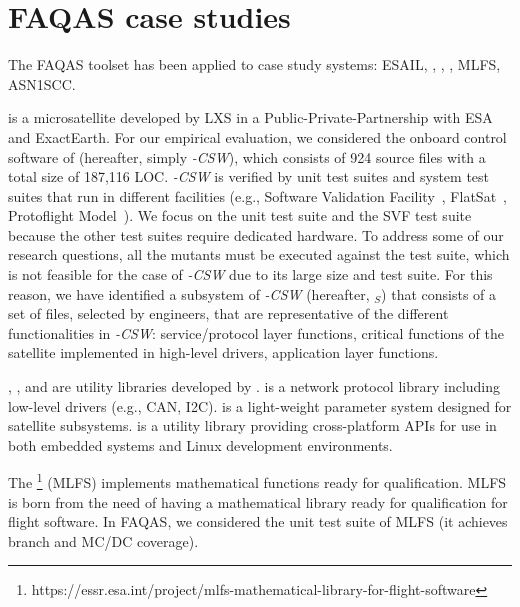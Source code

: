 
\chapter{FAQAS case studies}
\label{chapter:caseStudies}

\STARTCHANGEDFINAL
The FAQAS toolset has been applied to  case study systems:
ESAIL, \GCSP{}, \PARAM{}, \UTIL{}, MLFS, ASN1SCC.

 
 is a microsatellite developed by LXS in a Public-Private-Partnership with ESA and ExactEarth. For our empirical evaluation, we considered the onboard control software of \SAIL{} (hereafter, simply \SAIL{}\emph{-CSW}), which consists of 924 source files with a total size of 187,116 LOC. 
\SAIL{}\emph{-CSW} is verified by unit test suites and system test suites that run in different facilities (e.g., Software Validation Facility~\cite{Isasi2019}, FlatSat~\cite{Eickhoff:Simulate}, Protoflight Model~\cite{ecssHB10A}). We focus on the unit test suite and the SVF test suite because the other test suites require dedicated hardware.  
To address some of our research questions, all the mutants must be executed against the test suite, which is not feasible for the case of \SAIL{}\emph{-CSW} due to its large size and test suite. For this reason, we have identified a subsystem of \SAIL{}\emph{-CSW} (hereafter, \emph{\SAIL{}}$_{S}$) that consists of a set of files, selected by \TWO engineers, that are representative of the different functionalities in \SAIL{}\emph{-CSW}: service/protocol layer functions, critical functions of the satellite implemented in high-level drivers, application layer functions.

\INDEX{\GCSP{}}, \INDEX{\PARAM{}}, and \INDEX{\UTIL{}}  are utility libraries developed by \ONE.
\emph{\GCSP{}} is a network protocol library including low-level drivers (e.g., CAN, I2C).
{\PARAM{}} is a light-weight parameter system designed for \ONE satellite subsystems. 
{\UTIL{}} is a utility library providing cross-platform APIs for use in both embedded systems and Linux development environments.



The \footnote{https://essr.esa.int/project/mlfs-mathematical-library-for-flight-software} (MLFS) implements mathematical functions ready for qualification. 
MLFS is born from the need of having a mathematical library ready for qualification for flight software. 
In FAQAS, we considered the unit test suite of MLFS (it achieves branch and MC/DC coverage).

